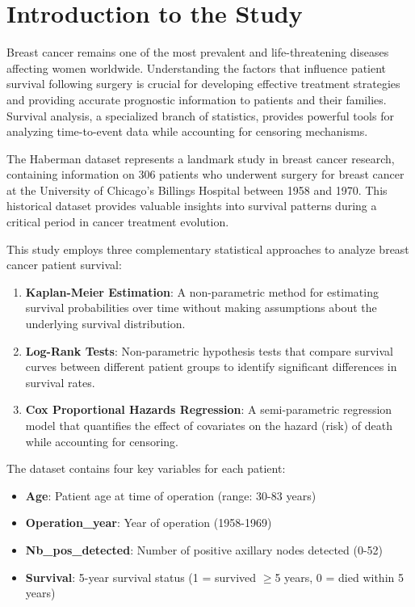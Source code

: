 \documentclass[12pt,a4paper]{article}
\begin{document}
\section{Introduction to the Study}

Breast cancer remains one of the most prevalent and life-threatening diseases affecting women worldwide. Understanding the factors that influence patient survival following surgery is crucial for developing effective treatment strategies and providing accurate prognostic information to patients and their families. Survival analysis, a specialized branch of statistics, provides powerful tools for analyzing time-to-event data while accounting for censoring mechanisms.

The Haberman dataset represents a landmark study in breast cancer research, containing information on 306 patients who underwent surgery for breast cancer at the University of Chicago's Billings Hospital between 1958 and 1970. This historical dataset provides valuable insights into survival patterns during a critical period in cancer treatment evolution.

This study employs three complementary statistical approaches to analyze breast cancer patient survival:

\begin{enumerate}
    \item \textbf{Kaplan-Meier Estimation}: A non-parametric method for estimating survival probabilities over time without making assumptions about the underlying survival distribution.
    \item \textbf{Log-Rank Tests}: Non-parametric hypothesis tests that compare survival curves between different patient groups to identify significant differences in survival rates.
    \item \textbf{Cox Proportional Hazards Regression}: A semi-parametric regression model that quantifies the effect of covariates on the hazard (risk) of death while accounting for censoring.
\end{enumerate}

The dataset contains four key variables for each patient:
\begin{itemize}
    \item \textbf{Age}: Patient age at time of operation (range: 30-83 years)
    \item \textbf{Operation\_year}: Year of operation (1958-1969)
    \item \textbf{Nb\_pos\_detected}: Number of positive axillary nodes detected (0-52)
    \item \textbf{Survival}: 5-year survival status (1 = survived $\geq$5 years, 0 = died within 5 years)
\end{itemize}
\end{document}
